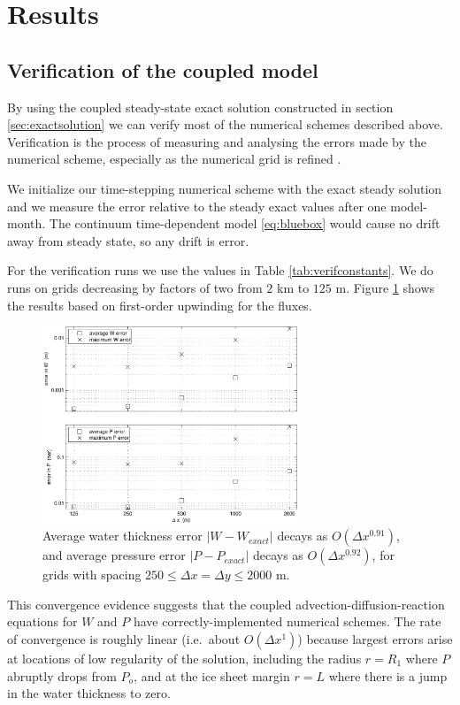 \documentclass[gmd]{copernicus}   %
\begin{document}
\section{Results}  \label{sec:results}

\subsection{Verification of the coupled model}  By using the coupled steady-state exact solution constructed in section \ref{sec:exactsolution} we can verify most of the numerical schemes described above.  Verification is the process of measuring and analysing the errors made by the numerical scheme, especially as the numerical grid is refined \citep{Wesseling,BLKCB}.

We initialize our time-stepping numerical scheme with the exact steady solution and we measure the error relative to the steady exact values after one model-month.  The continuum time-dependent model \eqref{eq:bluebox} would cause no drift away from steady state, so any drift is error.

For the verification runs we use the values in Table \ref{tab:verifconstants}.  We do runs on grids decreasing by factors of two from $2$ km to $125$ m.  Figure \ref{fig:refineWPpism} shows the results based on first-order upwinding for the fluxes.

\begin{figure}[ht]
\includegraphics[width=3.0in,keepaspectratio=true]{refineWPpism}
\caption{Average water thickness error $|W-W_{exact}|$ decays as $O(\Delta x^{0.91})$, and average pressure error $|P-P_{exact}|$ decays as $O(\Delta x^{0.92})$, for grids with spacing $250 \le \Delta x = \Delta y \le 2000$ m.}
\label{fig:refineWPpism}
\end{figure}

This convergence evidence suggests that the coupled advection-diffusion-reaction equations for $W$ and $P$ have correctly-implemented numerical schemes.  The rate of convergence is roughly linear (i.e.~about $O(\Delta x^1)$) because largest errors arise at locations of low regularity of the solution, including the radius $r=R_1$ where $P$ abruptly drops from $P_o$, and at the ice sheet margin $r=L$ where there is a jump in the water thickness to zero.
\end{document}
